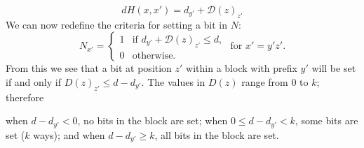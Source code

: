 \documentclass[conference]{IEEEtran}
\begin{document}
\begin{enumerate}[label={\em \arabic*.}]
			\begin{equation}
				dH(x,x') = d_{y'} + \mathcal{D}(z)_{z'}
				\end{equation}
			We can now redefine the criteria for setting a bit in $N$:
			\begin{equation*}
				N_{x'} = \left\{
				\begin{array}{rl}
					1 & \text{if } d_{y'} + \mathcal{D}(z)_{z'} \leq d,\\
					0 & \text{otherwise.}%
				\end{array} \right.
				\text{ for }x' = y'z'.
				\end{equation*}
			From this we see that a bit at position $z'$ within a block with prefix $y'$ will be set if and only if $D(z)_{z'} \leq d-d_{y'}$. The values in $D(z)$ range from 0 to $k$; therefore\newline

				{\small
					\hspace*{5pt} when $d-d_{y'} < 0$, 		\hspace*{24pt}no bits in the block are set;\newline
					\hspace*{5pt} when $0 \leq d-d_{y'} < k$,	\hspace*{6.5pt}some bits are set ($k$ ways); and\newline
					\hspace*{5pt} when $d-d_{y'} \geq k$, 		\hspace*{24pt}all bits in the block are set. \newline}
			

\end{enumerate}
\end{document}
